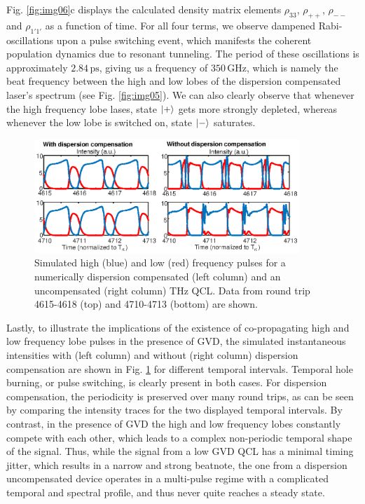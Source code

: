 \documentclass[10pt]{article}
\begin{document}
	Fig. \ref{fig:img06}c displays the calculated density matrix elements
	$\rho_{33}$, $\rho_{++}$, $\rho_{--}$ and $\rho_{1'1'}$ as a function of time. 
	For all four terms, we observe dampened Rabi-oscillations upon a pulse switching event, 
	which manifests the coherent population dynamics due to resonant tunneling. The
	period of these oscillations is approximately $2.84{\,}\mathrm{ps}$, giving us a frequency of $350{\,}\mathrm{GHz}$,
	which is namely the beat frequency between the high and low lobes of the dispersion compensated laser's spectrum
	(see Fig. \ref{fig:img05}). We can also clearly observe that whenever the high
	frequency lobe lases, state $\Ket{+}$ gets more strongly depleted, whereas 
	whenever the low lobe is switched on, state $\Ket{-}$ saturates. 
	
	\begin{figure}[h!]
		\begin{center}
			\includegraphics[width=10cm]{TEMPHOLEBURNING.eps}
		\end{center}
		\caption{Simulated high (blue) and low (red) frequency pulses for a
			numerically dispersion compensated (left column) and an uncompensated (right
			column) THz QCL. Data from round trip 4615-4618 (top) and
			4710-4713 (bottom) are shown.}%
		\label{fig:img07}%
	\end{figure}
	
	Lastly, to illustrate the implications of the existence of co-propagating high
	and low frequency lobe pulses in the presence of GVD, the simulated
	instantaneous intensities with (left column) and without (right column)
	dispersion compensation are shown in Fig. \ref{fig:img07} for different
	temporal intervals. Temporal hole burning, or pulse switching, is clearly
	present in both cases. For dispersion compensation, the periodicity is
	preserved over many round trips, as can be seen by comparing the intensity
	traces for the two displayed temporal intervals. By contrast, in the presence
	of GVD the high and low frequency lobes constantly compete with each other,
	which leads to a complex non-periodic temporal shape of the signal. Thus, while
	the signal from a low GVD QCL has a minimal timing jitter, which results in a
	narrow and strong beatnote, the one from a dispersion uncompensated device
	operates in a multi-pulse regime with a complicated temporal and spectral
	profile, and thus never quite reaches a steady state.
	
\end{document}
